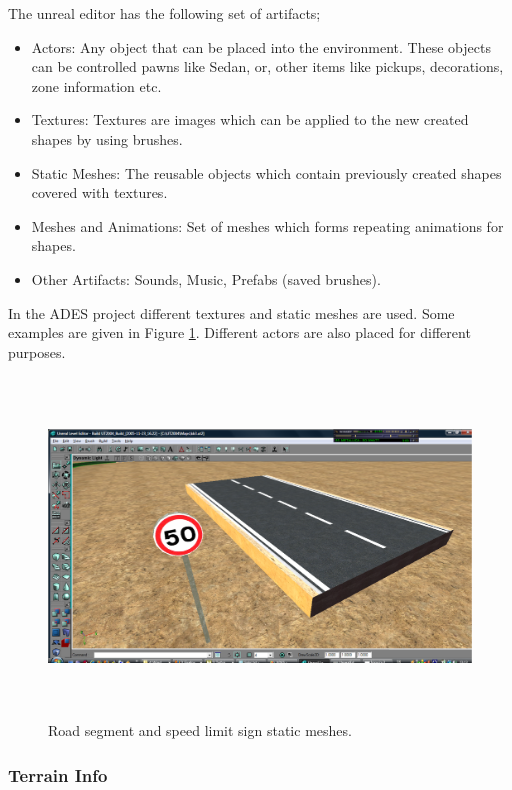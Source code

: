 \documentclass[a4paper,oneside,12pt]{report}
\begin{document}
The unreal editor has the following set of artifacts;
\begin{itemize}
    \item Actors: Any object that can be placed into the environment. These objects can be controlled pawns like Sedan, or, other items like pickups, decorations, zone information etc.
    \item Textures: Textures are images which can be applied to the new created shapes by using brushes.
    \item Static Meshes: The reusable objects which contain previously created shapes covered with textures.
    \item Meshes and Animations: Set of meshes which forms repeating animations for shapes.
    \item Other Artifacts: Sounds, Music, Prefabs (saved brushes).
\end{itemize}

In the ADES project different textures and static meshes are used. Some examples are given in Figure \ref{fig:StaticMesh}. Different actors are also placed for different purposes. 

\begin{figure}[ht]
\begin{center}
\includegraphics[width=150mm,height=90mm]{img/StaticMesh.eps}
\caption{Road segment and speed limit sign static meshes.}
\label{fig:StaticMesh}
\end{center}
\end{figure}

\subsubsection{Terrain Info}
\end{document}
